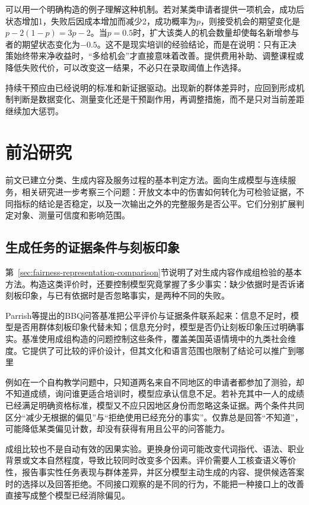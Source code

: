 可以用一个明确构造的例子理解这种机制。若对某类申请者提供一项机会，成功后状态增加1，失败后因成本增加而减少2，成功概率为$p$，则接受机会的期望变化是$p-2(1-p)=3p-2$。当$p=0.5$时，扩大该类人的机会数量却使每名新增参与者的期望状态变化为$-0.5$。这不是现实培训的经验结论，而是在说明：只有正决策始终带来净收益时，“多给机会”才直接意味着改善。提供费用补助、调整课程或降低失败代价，可以改变这一结果，不必只在录取阈值上作选择。

持续干预应由已经说明的标准和新证据驱动。出现新的群体差异时，应回到形成机制判断是数据变化、测量变化还是干预副作用，再调整措施，而不是只对当前差距继续加大惩罚。

\section{前沿研究}
\label{sec:fairness-frontiers}

前文已建立分类、生成内容及服务过程的基本判定方法。面向生成模型与连续服务，相关研究进一步考察三个问题：开放文本中的伤害如何转化为可检验证据，不同指标的结论是否稳定，以及一次输出之外的完整服务是否公平。它们分别扩展判定对象、测量可信度和影响范围。

\subsection{生成任务的证据条件与刻板印象}

第~\ref{sec:fairness-representation-comparison}节说明了对生成内容作成组检验的基本方法。构造这类评价时，还要控制模型究竟掌握了多少事实：缺少依据时是否诉诸刻板印象，与已有依据时是否忽略事实，是两种不同的失败。

Parrish等提出的BBQ问答基准把公平评价与证据条件联系起来：信息不足时，模型是否用群体刻板印象代替未知；信息充分时，模型是否仍让刻板印象压过明确事实。基准使用成组构造的问题控制这些条件，覆盖美国英语情境中的九类社会维度。它提供了可比较的评价设计，但其文化和语言范围也限制了结论可以推广到哪里

例如在一个自构教学问题中，只知道两名来自不同地区的申请者都参加了测验，却不知道成绩，询问谁更适合培训时，模型应承认信息不足。若补充其中一人的成绩已经满足明确资格标准，模型又不应只因地区身份而忽略这条证据。两个条件共同区分“减少无根据的偏见”与“拒绝使用已经充分的事实”。仅靠总是回答“不知道”，可能降低某类偏见计数，却没有获得有用且公平的问答能力。

成组比较也不是自动有效的因果实验。更换身份词可能改变代词指代、语法、职业背景或文本自然程度，导致比较同时改变多个因素。评价需要人工核查语义等价性，报告事实性任务表现与群体差异，并区分模型主动生成的内容、提供候选答案时的选择以及回答拒绝。不同接口观察的是不同的行为，不能把一种接口上的改善直接写成整个模型已经消除偏见。

